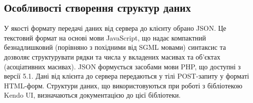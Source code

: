 \subsection{Особливості створення структур даних}
У якості формату передачі даних від сервера до клієнту обрано JSON. Це текстовий формат на основі мови JavaScript, що надає компактний безнадлишковий (порівняно з похідними від SGML мовами) синтаксис та дозволяє структурувати рядки та числа у вкладених масивах та об'єктах (асоціативних масивах). JSON формується засобами мови PHP, що доступні з версії 5.1. Дані від клієнта до сервера передаються у тілі POST-запиту у форматі HTML-форм. Структури даних, що використовуються при роботі з бібліотекою Kendo UI, визначаються документацією до цієї бібліотеки.
